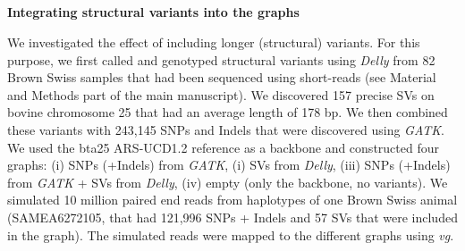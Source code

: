 \documentclass[../main.tex]{subfiles}
\begin{document}
\begin{flushleft}
\clearpage

\subsection{}
\textbf{Integrating structural variants into the graphs}
\bigskip


We investigated the effect of including longer (structural) variants. For this purpose, we first called and genotyped structural variants using \emph{Delly} \citep{rausch2012delly} from 82 Brown Swiss samples that had been sequenced using short-reads (see Material and Methods part of the main manuscript). We discovered 157 precise SVs on bovine chromosome 25 that had an average length of 178 bp. We then combined these variants with 243,145 SNPs and Indels that were discovered using \emph{GATK}. We used the bta25 ARS-UCD1.2 reference as a backbone and constructed four graphs: (i) SNPs (+Indels) from \emph{GATK}, (i) SVs from \emph{Delly},
(iii) SNPs (+Indels) from \emph{GATK} + SVs from \emph{Delly}, (iv) empty (only the backbone, no variants). We simulated 10 million paired end reads from haplotypes of one Brown Swiss animal (SAMEA6272105, that had 121,996 SNPs + Indels and 57 SVs that were included in the graph). The simulated reads were mapped to the different graphs using \emph{vg}.

\bigskip


\end{flushleft}
\end{document}
